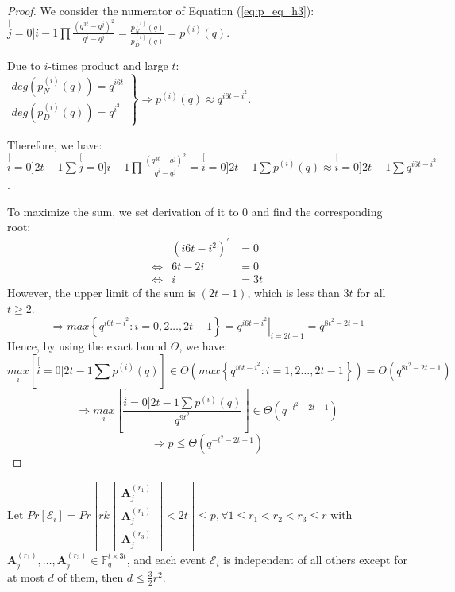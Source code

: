 \begin{proof}
We consider the numerator of Equation (\ref{eq:p_eq_h3}): $\stackrel[j=0]{i-1}{\mathop{\prod}}\frac{\left(q^{3t}-q^{j}\right)^{2}}{q^{i}-q^{j}}=\frac{p_{N}^{(i)}(q)}{p_{D}^{(i)}(q)}=p^{(i)}(q)$.

Due to $i$-times product and large $t$: $\left.\begin{array}{c}
deg\left(p_{N}^{(i)}(q)\right)=q^{i6t}\\
deg\left(p_{D}^{(i)}(q)\right)=q^{i^{2}}
\end{array}\right\} \Rightarrow p^{(i)}(q)\approx q^{i6t-i^{2}}$.

Therefore, we have: $\stackrel[i=0]{2t-1}{\mathop{\sum}}\stackrel[j=0]{i-1}{\mathop{\prod}}\frac{\left(q^{3t}-q^{j}\right)^{2}}{q^{i}-q^{j}}=\stackrel[i=0]{2t-1}{\mathop{\sum}}p^{(i)}(q)\approx\stackrel[i=0]{2t-1}{\mathop{\sum}}q^{i6t-i^{2}}$.

To maximize the sum, we set derivation of it to 0 and find the corresponding
root: 
\begin{eqnarray*}
 & \left(i6t-i^{2}\right)^{'} & =0\\
\Leftrightarrow & 6t-2i & =0\\
\Leftrightarrow & i & =3t
\end{eqnarray*}
However, the upper limit of the sum is $\left(2t-1\right)$, which
is less than $3t$ for all $t\geq2$.
\[
\Rightarrow max\left\{ q^{i6t-i^{2}}:i=0,2\ldots,2t-1\right\} =\left.q^{i6t-i^{2}}\right|_{i=2t-1}=q^{8t^{2}-2t-1}
\]
Hence, by using the exact bound $\Theta$, we have:
\[
\underset{i}{max}\left[\stackrel[i=0]{2t-1}{\mathop{\sum}}p^{(i)}(q)\right]\in\Theta\left(max\left\{ q^{i6t-i^{2}}:i=1,2\ldots,2t-1\right\} \right)=\Theta\left(q^{8t^{2}-2t-1}\right)
\]
\[
\Rightarrow\underset{i}{max}\left[\frac{\stackrel[i=0]{2t-1}{\mathop{\sum}}p^{(i)}(q)}{q^{9t^{2}}}\right]\in\Theta\left(q^{-t^{2}-2t-1}\right)
\]
\[
\Rightarrow p\leq\Theta\left(q^{-t^{2}-2t-1}\right)
\]
\end{proof}
\begin{lem}
Let $Pr\left[\mathcal{E}_{i}\right]=Pr\left[rk\left[\begin{array}{c}
\boldsymbol{A}_{j}^{\left(r_{1}\right)}\\
\boldsymbol{A}_{j}^{\left(r_{1}\right)}\\
\boldsymbol{A}_{j}^{\left(r_{3}\right)}
\end{array}\right]<2t\right]\leq p,\forall1\leq r_{1}<r_{2}<r_{3}\leq r$ with $\boldsymbol{A}_{j}^{\left(r_{1}\right)},\ldots,\boldsymbol{A}_{j}^{\left(r_{3}\right)}\in\ensuremath{\mathbb{F}}_{q}^{t\times3t}$,
and each event $\mathcal{E}_{i}$ is independent of all others except
for at most $d$ of them, then $d\leq\frac{3}{2}r^{2}$. \label{lem:dependecy_d_LLL}
\end{lem}
